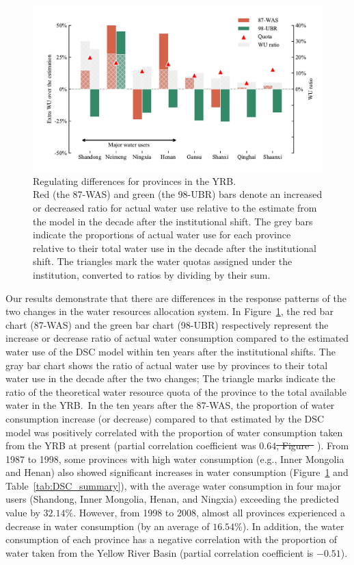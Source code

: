 \documentclass[preprint, 12pt]{elsarticle}
\providecommand{\DIFdeltex}[1]{{\protect\color{red}\sout{#1}}}                      %
\providecommand{\DIFdelbegin}{} %
\providecommand{\DIFdelend}{} %
\providecommand{\DIFdel}[1]{\texorpdfstring{\DIFdeltex{#1}}{}} %
\begin{document}
\begin{figure}[!htb]
	\centering
	\includegraphics[width=0.9\linewidth]{outputs/fig3.pdf}
	\caption{
		Regulating differences for provinces in the YRB.\\
		Red (the 87-WAS) and green (the 98-UBR) bars denote an increased or decreased ratio for actual water use relative to the estimate from the model in the decade after the institutional shift.
		The grey bars indicate the proportions of actual water use for each province relative to their total water use in the decade after the institutional shift.
		The triangles mark the water quotas assigned under the institution, converted to ratios by dividing by their sum.
	}\label{fig:regulating}
\end{figure}

Our results demonstrate that there are differences in the response patterns of the two changes in the water resources allocation system.
In Figure~\ref{fig:regulating}, the red bar chart (87-WAS) and the green bar chart (98-UBR) respectively represent the increase or decrease ratio of actual water consumption compared to the estimated water use of the DSC model within ten years after the institutional shifts.
The gray bar chart shows the ratio of actual water use by provinces to their total water use in the decade after the two changes; The triangle marks indicate the ratio of the theoretical water resource quota of the province to the total available water in the YRB.\
In the ten years after the 87-WAS, the proportion of water consumption increase (or decrease) compared to that estimated by the DSC model was positively correlated with the proportion of water consumption taken from the YRB at present (partial correlation coefficient was $0.64$\DIFdelbegin \DIFdel{, Figure~}%
\DIFdelend ).
From 1987 to 1998, some provinces with high water consumption (e.g., Inner Mongolia and Henan) also showed significant increases in water consumption (Figure~\ref{fig:regulating} and Table~\ref{tab:DSC_summary}), with the average water consumption in four major users (Shandong, Inner Mongolia, Henan, and Ningxia) exceeding the predicted value by $32.14\%$.
However, from 1998 to 2008, almost all provinces experienced a decrease in water consumption (by an average of $16.54\%$).
In addition, the water consumption of each province has a negative correlation with the proportion of water taken from the Yellow River Basin (partial correlation coefficient is $-0.51$).
\end{document}

